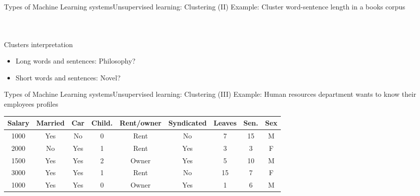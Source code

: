 \documentclass[10pt,compress]{beamer} %
\begin{document}
\begin{frame}{Types of Machine Learning systems}{Unsupervised learning: Clustering (II)}
	Example: Cluster word-sentence length in a books corpus

    \begin{columns}
			\begin{figure}
			\centering{
			\resizebox{\textwidth}{!}{}}
			\end{figure}
    \end{columns}

	Clusters interpretation
	\begin{itemize}
		\item Long words and sentences: Philosophy?
		\item Short words and sentences: Novel?
	\end{itemize}
\end{frame}

\begin{frame}{Types of Machine Learning systems}{Unsupervised learning: Clustering (III)}
	Example: Human resources department wants to know their employees profiles

	\begin{center}
	\begin{tabular}{ccccccccc}\hline
		 Salary & Married & Car & Child. & Rent/owner & Syndicated & Leaves & Sen. & Sex \\\hline
		 1000   & Yes     & No  & 0      & Rent       & No         & 7      & 15   & M   \\
		 2000   & No      & Yes & 1      & Rent       & Yes        & 3      & 3    & F   \\
		 1500   & Yes     & Yes & 2      & Owner      & Yes        & 5      & 10   & M   \\
		 3000   & Yes     & Yes & 1      & Rent       & No         & 15     & 7    & F   \\
		 1000   & Yes     & Yes & 0      & Owner      & Yes        & 1      & 6    & M   \\
		 \hline
	 \end{tabular}
	 \end{center}
\end{frame}
\end{document}
